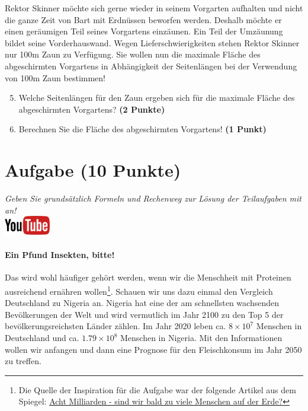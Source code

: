 \documentclass[a4paper, 9pt]{scrartcl}\usepackage[]{graphicx}\usepackage[]{xcolor}
\begin{document}
Rektor Skinner m{\"o}chte sich gerne wieder in seinem Vorgarten aufhalten und
nicht die ganze Zeit von Bart mit Erdn{\"u}ssen beworfen werden. Deshalb m{\"o}chte
er einen ger{\"a}umigen Teil seines Vorgartens einz{\"a}unen. Ein Teil der
Umz{\"a}unung bildet seine Vorderhauswand. Wegen Lieferschwierigkeiten stehen
Rektor Skinner nur 100m Zaun zu Verf{\"u}gung. Sie wollen nun die
maximale Fl{\"a}che des abgeschirmten Vorgartens in Abh{\"a}ngigkeit der
Seitenl{\"a}ngen bei der Verwendung von 100m Zaun bestimmen!

\begin{enumerate}
  \setcounter{enumi}{4}  
\item  Welche Seitenl{\"a}ngen f{\"u}r den Zaun ergeben sich f{\"u}r die
  maximale Fl{\"a}che des abgeschirmten Vorgartens? \textbf{(2 Punkte)}
\item Berechnen Sie die Fl{\"a}che des abgeschirmten Vorgartens! \textbf{(1
    Punkt)}
\end{enumerate}

 
\clearpage

\section{Aufgabe \hfill (10 Punkte)}

\textit{Geben Sie grunds{\"a}tzlich Formeln und Rechenweg zur L{\"o}sung der
  Teilaufgaben mit an!} \\[1Ex]

\hfill\href{https://youtu.be/OhyuH6hzEhY}{\includegraphics[width = 2cm]{img/youtube}} %
\hspace{2Ex}




\paragraph{Ein Pfund Insekten, bitte!} Das wird wohl h{\"a}ufiger geh{\"o}rt
werden, wenn wir die Menschheit mit Proteinen ausreichend ern{\"a}hren
wollen\footnote{Die Quelle der Inspiration f{\"u}r die Aufgabe war der folgende
  Artikel aus dem Spiegel:
  \href{https://www.spiegel.de/ausland/ueberbevoelkerung-acht-milliarden-sind-wir-bald-zu-viele-menschen-auf-der-erde-a-3f20c7bc-3d60-4440-9f52-eb338db207f5}{Acht
    Milliarden - sind wir bald zu viele Menschen auf der Erde?}}. Schauen
wir uns dazu einmal den Vergleich Deutschland zu Nigeria an. Nigeria hat
eine der am schnellsten wachsenden Bev{\"o}lkerungen der Welt und wird
vermutlich im Jahr 2100 zu den Top 5 der bev{\"o}lkerungsreichsten L{\"a}nder
z{\"a}hlen. Im Jahr 2020 leben ca. \ensuremath{8\times 10^{7}} Menschen in
Deutschland und ca. \ensuremath{1.79\times 10^{8}} Menschen in Nigeria. Mit den
Informationen wollen wir anfangen und dann eine Prognose f{\"u}r den
Fleischkonsum im Jahr 2050 zu treffen. \\ 
\end{document}
